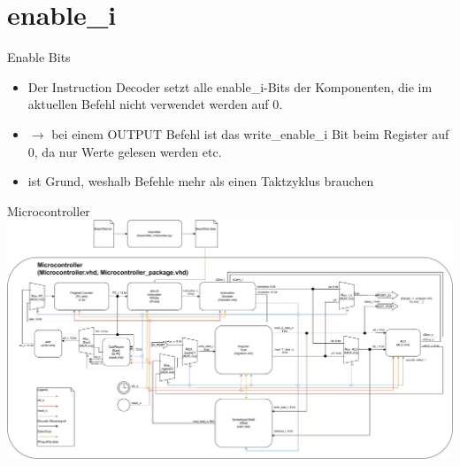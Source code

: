 \documentclass[10pt, t,
aspectratio=169,%
usenames,
dvipsnames,
]{beamer}
\begin{document}
	\section{enable\_i}
	
	\begin{frame}{Enable Bits}
		\begin{itemize}
			\item Der Instruction Decoder setzt alle enable\_i-Bits der Komponenten, die im aktuellen Befehl nicht verwendet werden auf 0.
			\item $\rightarrow$ bei einem OUTPUT Befehl ist das write\_enable\_i Bit beim Register auf 0, da nur Werte gelesen werden etc.
			\item ist Grund, weshalb Befehle mehr als einen Taktzyklus brauchen
		\end{itemize}
	\end{frame}

	\begin{frame}{Microcontroller}
		\includegraphics[width=.95\linewidth]{../Blockbeschreibungen/BlockdiagramMitVHDL.pdf}
	\end{frame}
\end{document}
